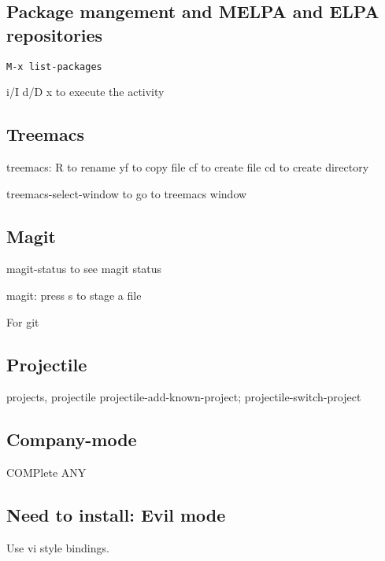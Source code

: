 \subsection{Package mangement and MELPA and ELPA repositories}

\begin{verbatim}
M-x list-packages
\end{verbatim}

i/I
d/D
x to execute the activity

\subsection{Treemacs}

treemacs: R to rename
yf to copy file
cf to create file
cd to create directory

treemacs-select-window to go to treemacs window
\subsection{Magit}
magit-status to see magit status

magit: press s to stage a file


For git
\subsection{Projectile}

projects, projectile
projectile-add-known-project; projectile-switch-project

\subsection{Company-mode}
COMPlete ANY

\subsection{Need to install: Evil mode}

Use vi style bindings.
